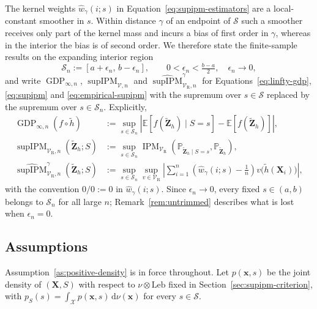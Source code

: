 The kernel weights $\widehat{w}_{\gamma}(i;s)$ in Equation~\ref{eq:supipm-estimators} are a local-constant smoother in $s$.  Within distance $\gamma$ of an endpoint of $\mathcal{S}$ such a smoother receives only part of the kernel mass and incurs a bias of first order in $\gamma$, whereas in the interior the bias is of second order.  We therefore state the finite-sample results on the expanding interior region
\begin{equation}
  \mathcal{S}_n:=[a+\epsilon_n,\,b-\epsilon_n],
  \qquad 0<\epsilon_n<\tfrac{b-a}{2},\quad \epsilon_n\to0,
  \label{eq:trimmed-domain}
\end{equation}
and write $\operatorname{GDP}_{\infty,n}$, $\operatorname{supIPM}_{\mathcal{V},n}$ and $\widehat{\operatorname{supIPM}}^{\gamma}_{\mathcal{V}_{\mathrm{R}},n}$ for Equations~\ref{eq:linfty-gdp}, \ref{eq:supipm} and \ref{eq:empirical-supipm} with the supremum over $s\in\mathcal{S}$ replaced by the supremum over $s\in\mathcal{S}_n$.  Explicitly,
\begin{align}
  \operatorname{GDP}_{\infty,n}(f\circ\widetilde{h})
  &:=\sup_{s\in\mathcal{S}_n}
     \left|\mathbb{E}[f(\widetilde{\mathbf{Z}}_h)\mid S=s]
           -\mathbb{E}[f(\widetilde{\mathbf{Z}}_h)]\right|,
  \label{eq:trimmed-gdp}\\
  \operatorname{supIPM}_{\mathcal{V}_{\mathrm{R}},n}(\widetilde{\mathbf{Z}}_h;S)
  &:=\sup_{s\in\mathcal{S}_n}
     \operatorname{IPM}_{\mathcal{V}_{\mathrm{R}}}
     \left(\mathbb{P}_{\widetilde{\mathbf{Z}}_h\mid S=s},
           \mathbb{P}_{\widetilde{\mathbf{Z}}_h}\right),
  \label{eq:trimmed-supipm}\\
  \widehat{\operatorname{supIPM}}^{\gamma}_{\mathcal{V}_{\mathrm{R}},n}
  (\widetilde{\mathbf{Z}}_h;S)
  &:=\sup_{s\in\mathcal{S}_n}
     \sup_{v\in\mathcal{V}_{\mathrm{R}}}
     \left|\sum_{i=1}^n
       \left(\widehat{w}_{\gamma}(i;s)-\frac1n\right)
       v\big(\widetilde{h}(\mathbf{X}_i)\big)\right|,
  \label{eq:trimmed-empirical-supipm}
\end{align}
with the convention $0/0:=0$ in $\widehat{w}_{\gamma}(i;s)$.  Since $\epsilon_n\to0$, every fixed $s\in(a,b)$ belongs to $\mathcal{S}_n$ for all large $n$; Remark~\ref{rem:untrimmed} describes what is lost when $\epsilon_n=0$.

\subsection{Assumptions}
\label{sec:theory-assumptions}

Assumption~\ref{as:positive-density} is in force throughout.  Let $p(\mathbf{x},s)$ be the joint density of $(\mathbf{X},S)$ with respect to $\nu\otimes\mathrm{Leb}$ fixed in Section~\ref{sec:supipm-criterion}, with $p_S(s)=\int_{\mathcal{X}}p(\mathbf{x},s)\,\mathrm{d}\nu(\mathbf{x})$ for every $s\in\mathcal{S}$.

